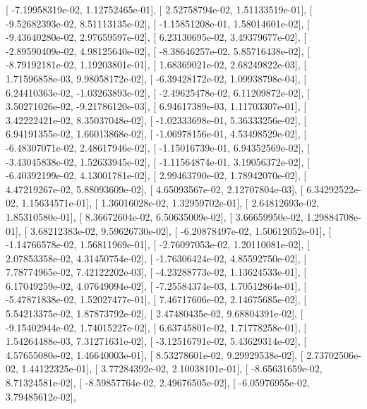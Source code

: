 \documentclass{article}
\begin{document}
       [ -7.19958319e-02,   1.12752465e-01],
       [  2.52758794e-02,   1.51133519e-01],
       [ -9.52682393e-02,   8.51113135e-02],
       [ -1.15851208e-01,   1.58014601e-02],
       [ -9.43640280e-02,   2.97659597e-02],
       [  6.23130695e-02,   3.49379677e-02],
       [ -2.89590409e-02,   4.98125640e-02],
       [ -8.38646257e-02,   5.85716438e-02],
       [ -8.79192181e-02,   1.19203801e-01],
       [  1.68369021e-02,   2.68249822e-03],
       [  1.71596858e-03,   9.98058172e-02],
       [ -6.39428172e-02,   1.09938798e-04],
       [  6.24410363e-02,  -1.03263893e-02],
       [ -2.49625478e-02,   6.11209872e-02],
       [  3.50271026e-02,  -9.21786120e-03],
       [  6.94617389e-03,   1.11703307e-01],
       [  3.42222421e-02,   8.35037048e-02],
       [ -1.02333698e-01,   5.36333256e-02],
       [  6.94191355e-02,   1.66013868e-02],
       [ -1.06978156e-01,   4.53498529e-02],
       [ -6.48307071e-02,   2.48617946e-02],
       [ -1.15016739e-01,   6.94352569e-02],
       [ -3.43045838e-02,   1.52633945e-02],
       [ -1.11564874e-01,   3.19056372e-02],
       [ -6.40392199e-02,   4.13001781e-02],
       [  2.99463790e-02,   1.78942070e-02],
       [  4.47219267e-02,   5.88093609e-02],
       [  4.65093567e-02,   2.12707804e-03],
       [  6.34292522e-02,   1.15634571e-01],
       [  1.36016028e-02,   1.32959702e-01],
       [  2.64812693e-02,   1.85310580e-01],
       [  8.36672604e-02,   6.50635009e-02],
       [  3.66659950e-02,   1.29884708e-01],
       [  3.68212383e-02,   9.59626730e-02],
       [ -6.20878497e-02,   1.50612052e-01],
       [ -1.14766578e-02,   1.56811969e-01],
       [ -2.76097053e-02,   1.20110081e-02],
       [  2.07853358e-02,   4.31450754e-02],
       [ -1.76306424e-02,   4.85592750e-02],
       [  7.78774965e-02,   7.42122202e-03],
       [ -4.23288773e-02,   1.13624533e-01],
       [  6.17049259e-02,   4.07649094e-02],
       [ -7.25584374e-03,   1.70512864e-01],
       [ -5.47871838e-02,   1.52027477e-01],
       [  7.46717606e-02,   2.14675685e-02],
       [  5.54213375e-02,   1.87873792e-02],
       [  2.47480435e-02,   9.68804391e-02],
       [ -9.15402944e-02,   1.74015227e-02],
       [  6.63745801e-02,   1.71778258e-01],
       [  1.54264488e-03,   7.31271631e-02],
       [ -3.12516791e-02,   5.43629314e-02],
       [  4.57655080e-02,   1.46640003e-01],
       [  8.53278601e-02,   9.29929538e-02],
       [  2.73702506e-02,   1.44122325e-01],
       [  3.77284392e-02,   2.10038101e-01],
       [ -8.65631659e-02,   8.71324581e-02],
       [ -8.59857764e-02,   2.49676505e-02],
       [ -6.05976955e-02,   3.79485612e-02],
\end{document}
